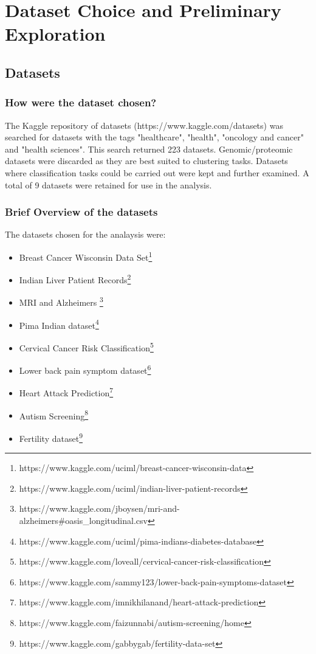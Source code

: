 \section{Dataset Choice and Preliminary Exploration}
\subsection{Datasets}
\subsubsection{How were the dataset chosen?}
The Kaggle repository of datasets (https://www.kaggle.com/datasets) was searched for datasets with the tags "healthcare", "health", "oncology and cancer" and "health sciences".
This search returned 223 datasets. Genomic/proteomic datasets were discarded as they are best suited to clustering tasks. Datasets where classification tasks could be carried out were kept and further examined.
A total of 9 datasets were retained for use in the analysis.

\subsubsection{Brief Overview of the datasets}
The datasets chosen for the analaysis were:
\begin{itemize}
    \item Breast Cancer Wisconsin Data Set\footnote{https://www.kaggle.com/uciml/breast-cancer-wisconsin-data}  
    \item Indian Liver Patient Records\footnote{https://www.kaggle.com/uciml/indian-liver-patient-records} 
    \item MRI and Alzheimers \footnote{https://www.kaggle.com/jboysen/mri-and-alzheimers\#oasis\_longitudinal.csv}
    \item Pima Indian dataset\footnote{https://www.kaggle.com/uciml/pima-indians-diabetes-database} 
    \item Cervical Cancer Risk Classification\footnote{https://www.kaggle.com/loveall/cervical-cancer-risk-classification  }
    \item Lower back pain symptom dataset\footnote{ https://www.kaggle.com/sammy123/lower-back-pain-symptoms-dataset}
    \item Heart Attack Prediction\footnote{https://www.kaggle.com/imnikhilanand/heart-attack-prediction}
    \item Autism Screening\footnote{https://www.kaggle.com/faizunnabi/autism-screening/home} 
    \item Fertility dataset\footnote{https://www.kaggle.com/gabbygab/fertility-data-set} 
    
   
\end{itemize}

